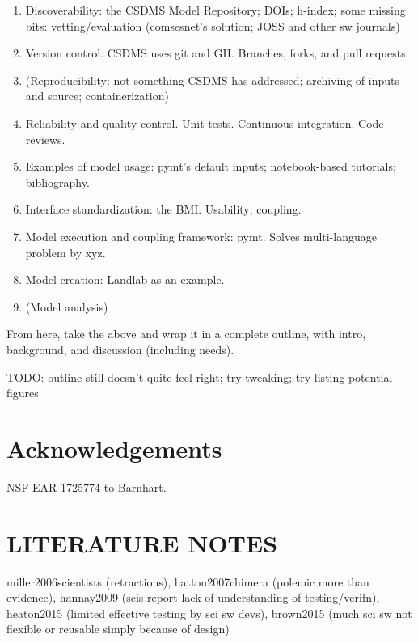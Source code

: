 \documentclass[12pt]{amsart}
\begin{document}
\begin{enumerate}
\item Discoverability: the CSDMS Model Repository; DOIs; h-index; some missing bits: vetting/evaluation (comsesnet's solution; JOSS and other sw journals)
\item Version control. CSDMS uses git and GH. Branches, forks, and pull requests.
\item (Reproducibility: not something CSDMS has addressed; archiving of inputs and source; containerization)
\item Reliability and quality control. Unit tests. Continuous integration. Code reviews.
\item Examples of model usage: pymt's default inputs; notebook-based tutorials; bibliography.
\item Interface standardization: the BMI. Usability; coupling.
\item Model execution and coupling framework: pymt. Solves multi-language problem by xyz.
\item Model creation: Landlab as an example.
\item (Model analysis)
\end{enumerate}

From here, take the above and wrap it in a complete outline, with intro, background, and discussion (including needs).

TODO: outline still doesn't quite feel right; try tweaking; try listing potential figures
\section{Acknowledgements}

NSF-EAR 1725774 to Barnhart.








\section*{LITERATURE NOTES}


miller2006scientists (retractions), hatton2007chimera (polemic more than evidence), hannay2009 (scis report lack of understanding of testing/verifn), heaton2015 (limited effective testing by sci sw devs), brown2015 (much sci sw not flexible or reusable simply because of design)
\end{document}

